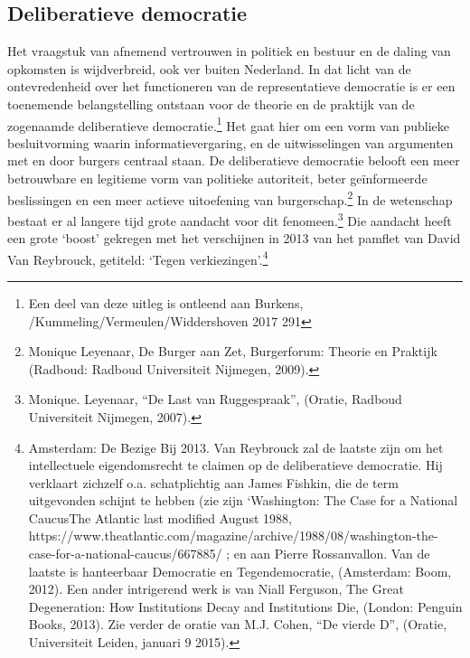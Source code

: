 \documentclass{jote-book}
\begin{document}
	\subsection{Deliberatieve democratie}



	Het vraagstuk van afnemend vertrouwen in politiek en bestuur en de daling van opkomsten is wijdverbreid, ook ver buiten Nederland. In dat licht van de ontevredenheid over het functioneren van de representatieve democratie is er een toenemende belangstelling ontstaan voor de theorie en de praktijk van de zogenaamde deliberatieve democratie.\footnote{Een deel van deze uitleg is ontleend aan Burkens, /Kummeling/Vermeulen/Widdershoven 2017 291} Het gaat hier om een vorm van publieke besluitvorming waarin informatievergaring, en de uitwisselingen van argumenten met en door burgers centraal staan. De deliberatieve democratie belooft een meer betrouwbare en legitieme vorm van politieke autoriteit, beter geïnformeerde beslissingen en een meer actieve uitoefening van burgerschap.\footnote{Monique Leyenaar, De Burger aan Zet, Burgerforum: Theorie en Praktijk (Radboud: Radboud Universiteit Nijmegen, 2009).} In de wetenschap bestaat er al langere tijd grote aandacht voor dit fenomeen.\footnote{Monique. Leyenaar, “De Last van Ruggespraak”, (Oratie, Radboud Universiteit Nijmegen, 2007).} Die aandacht heeft een grote ‘boost' gekregen met het verschijnen in 2013 van het pamflet van David Van Reybrouck, getiteld: ‘Tegen verkiezingen'.\footnote{Amsterdam: De Bezige Bij 2013. Van Reybrouck zal de laatste zijn om het intellectuele eigendomsrecht te claimen op de deliberatieve democratie. Hij verklaart zichzelf o.a. schatplichtig aan James Fishkin, die de term uitgevonden schijnt te hebben (zie zijn ‘Washington: The Case for a National CaucusThe Atlantic last modified August 1988, https://www.theatlantic.com/magazine/archive/1988/08/washington-the-case-for-a-national-caucus/667885/ ; en aan Pierre Rossanvallon. Van de laatste is hanteerbaar Democratie en Tegendemocratie, (Amsterdam: Boom, 2012). Een ander intrigerend werk is van Niall Ferguson, The Great Degeneration: How Institutions Decay and Institutions Die, (London: Penguin Books, 2013). Zie verder de oratie van M.J. Cohen, “De vierde D”, (Oratie, Universiteit Leiden, januari 9 2015).}
\end{document}
